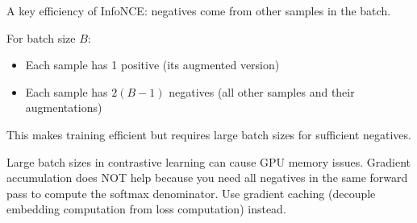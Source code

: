 A key efficiency of InfoNCE: negatives come from other samples in the batch.

For batch size $B$:
\begin{itemize}
    \item Each sample has 1 positive (its augmented version)
    \item Each sample has $2(B-1)$ negatives (all other samples and their augmentations)
\end{itemize}

This makes training efficient but requires large batch sizes for sufficient negatives.

\begin{warningbox}
Large batch sizes in contrastive learning can cause GPU memory issues. Gradient accumulation does NOT help because you need all negatives in the same forward pass to compute the softmax denominator. Use gradient caching (decouple embedding computation from loss computation) instead.
\end{warningbox}

